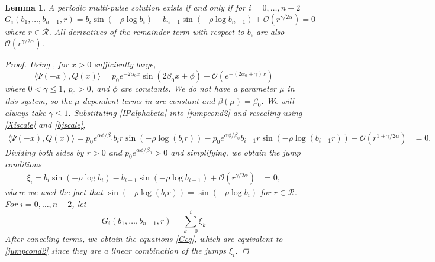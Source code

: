 \documentclass[10pt,reqno]{amsart}
\theoremstyle{plain}
\newtheorem{lemma}[theorem]{Lemma}
\theoremstyle{definition}
\theoremstyle{remark}
\numberwithin{theorem}{section}
\numberwithin{equation}{section}
\begin{document}
\begin{lemma}\label{jumplemma3}
A periodic multi-pulse solution exists if and only if for $i = 0, \dots, n-2$
\begin{equation}\label{Geq}
G_i(b_1, \dots, b_{n-1}, r) = b_i \sin \left( -\rho \log b_i \right) - b_{n-1} \sin \left( -\rho \log b_{n-1} \right) + \mathcal{O}(r^{\gamma / 2 \alpha}) = 0
\end{equation}
where $r \in \mathcal{R}$. All derivatives of the remainder term with respect to $b_i$ are also $\mathcal{O}(r^{\gamma / 2 \alpha})$. 
\begin{proof}
Using \cite[Lemma 6.1(i)]{Sandstede1998}, for $x > 0$ sufficiently large,
\begin{equation}\label{IPalphabeta}
\langle \Psi(-x), Q(x) \rangle
= p_0 e^{-2 \alpha_0 x} \sin(2 \beta_0 x + \phi) + \mathcal{O}(e^{-(2 \alpha_0 + \gamma) x})
\end{equation}
where $0 < \gamma \leq 1$, $p_0 > 0$, and $\phi$ are constants. We do not have a parameter $\mu$ in this system, so the $\mu$-dependent terms in \cite[Lemma 6.1(i)]{Sandstede1998} are constant and $\beta(\mu) = \beta_0$. We will always take $\gamma \leq 1$. Substituting \cref{IPalphabeta} into \cref{jumpcond2} and rescaling using \cref{Xiscale} and \cref{bjscale},
\begin{align}\label{diff2}
\langle \Psi(-x), Q(x) \rangle = p_0 e^{\alpha \phi / \beta_0 } b_i r \sin \left( - \rho \log (b_i r) \right) - p_0 e^{\alpha \phi / \beta_0 } b_{i-1} r \sin \left( -\rho \log (b_{i-1} r) \right) + \mathcal{O}(r^{1 + \gamma / 2 \alpha}) &= 0.
\end{align}
Dividing both sides by $r > 0$ and $p_0 e^{\alpha \phi / \beta_0 } > 0$ and simplifying, we obtain the jump conditions
\begin{align}\label{diff3}
\xi_i = b_i \sin \left( -\rho \log b_i \right) - b_{i-1} \sin \left( -\rho \log b_{i-1} \right) + \mathcal{O}(r^{\gamma / 2 \alpha}) &= 0,
\end{align} 
where we used the fact that $\sin \left( -\rho \log (b_i r) \right) = \sin \left( -\rho \log b_i \right)$ for $r \in \mathcal{R}$. For $i = 0, \dots, n-2$, let
\begin{equation}\label{Gidef}
G_i(b_1, \dots, b_{n-1}, r) = \sum_{k = 0}^i \xi_k
\end{equation}
After canceling terms, we obtain the equations \cref{Geq}, which are equivalent to \cref{jumpcond2} since they are a linear combination of the jumps $\xi_i$.
\end{proof}
\end{lemma}
\end{document}
